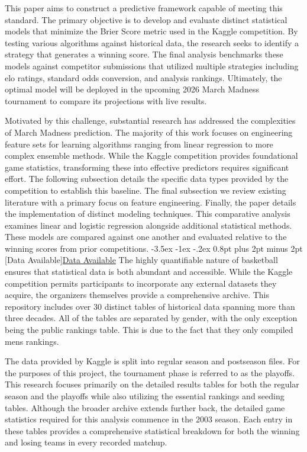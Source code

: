 \documentclass[12pt,leqno]{article}\usepackage[pdftex]{graphicx}\usepackage[usenames,dvipsnames]{xcolor}
\makeatletter
\renewcommand\subsection{\@startsection {subsection}{1}{\z@}%
{-3.5ex \@plus -1ex \@minus -.2ex}%
{0.8pt plus 2pt minus 2pt}%
{\normalfont}}
\newcommand{\usubsection}[1]{\subsection[#1]{\centering\normalfont\underline{#1}}}%
\theoremstyle{remark}
\makeatother
\begin{document}
This paper aims to construct a predictive framework capable of meeting this standard. The primary objective is to develop and evaluate distinct statistical models that minimize the Brier Score metric used in the Kaggle competition. By testing various algorithms against historical data, the research seeks to identify a strategy that generates a winning score. The final analysis benchmarks these models against competitor submissions that utilized multiple strategies including elo ratings, standard odds conversion, and analysis rankings. Ultimately, the optimal model will be deployed in the upcoming 2026 March Madness tournament to compare its projections with live results.


Motivated by this challenge, substantial research has addressed the complexities of March Madness prediction. The majority of this work focuses on engineering feature sets for learning algorithms ranging from linear regression to more complex ensemble methods. While the Kaggle competition provides foundational game statistics, transforming these into effective predictors requires significant effort. The following subsection details the specific data types provided by the competition to establish this baseline. The final subsection we review existing literature with a primary focus on feature engineering. Finally, the paper details the implementation of distinct modeling techniques. This comparative analysis examines linear and logistic regression alongside additional statistical methods. These models are compared against one another and evaluated relative to the winning scores from prior competitions.
\usubsection{Data Available}
The highly quantifiable nature of basketball ensures that statistical data is both abundant and accessible. While the Kaggle competition permits participants to incorporate any external datasets they acquire, the organizers themselves provide a comprehensive archive. This repository includes over 30 distinct tables of historical data spanning more than three decades. All of the tables are separated by gender, with the only exception being the public rankings table. This is due to the fact that they only compiled mens rankings. 

The data provided by Kaggle is split into regular season and postseason files. For the purposes of this project, the tournament phase is referred to as the playoffs. This research focuses primarily on the detailed results tables for both the regular season and the playoffs while also utilizing the essential rankings and seeding tables. Although the broader archive extends further back, the detailed game statistics required for this analysis commence in the 2003 season. Each entry in these tables provides a comprehensive statistical breakdown for both the winning and losing teams in every recorded matchup.
\end{document}
